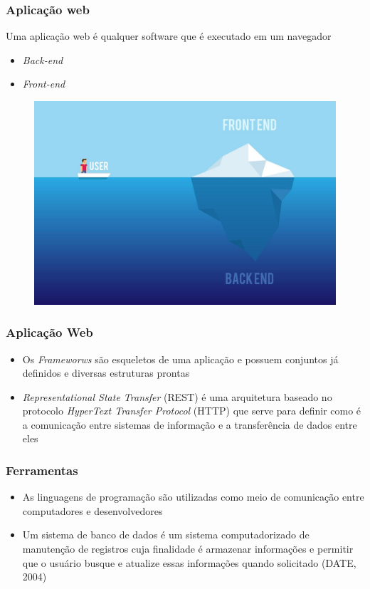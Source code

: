 \documentclass{beamer}
\begin{document}
	\begin{frame}\frametitle{Aplicação web}
		Uma aplicação web é qualquer software que é executado em um navegador
		\begin{itemize}
			\item \textit{Back-end}
			\item \textit{Front-end}
		\end{itemize}
		\begin{figure}[ht]
			\centering
			\includegraphics[scale=0.11]{img/front-back.jpg}
		\end{figure}
	\end{frame}

	\begin{frame}\frametitle{Aplicação Web}
		\begin{itemize}
			\item Os \textit{Frameworws} são esqueletos de uma aplicação e possuem conjuntos já definidos e diversas estruturas prontas
			\item \textit{Representational State Transfer} (REST) é uma arquitetura baseado no protocolo \textit{HyperText Transfer Protocol} (HTTP) que serve para definir como é a comunicação entre sistemas de informação e a transferência de dados entre eles
		\end{itemize}
	\end{frame}


	\begin{frame}\frametitle{Ferramentas}
		\begin{itemize}
			\item As linguagens de programação são utilizadas como meio de comunicação entre computadores e desenvolvedores
			\item Um sistema de banco de dados é um sistema computadorizado de manutenção de registros cuja finalidade é armazenar informações e permitir que o usuário busque e atualize essas informações quando solicitado (DATE, 2004)
		\end{itemize}
	\end{frame}
\end{document}
